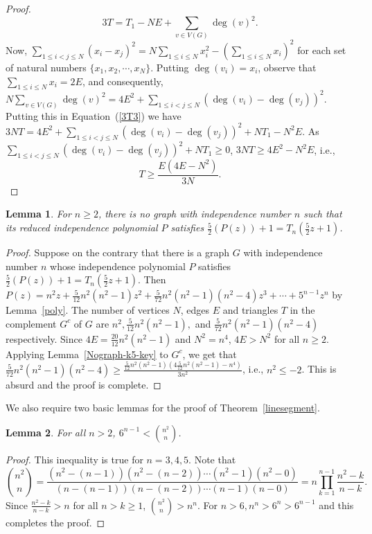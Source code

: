 \documentclass[12pt,a4paper]{article}
\theoremstyle{plain}
\newtheorem{lemma}{Lemma}
\numberwithin{equation}{section}
\begin{document}
\begin{proof}
\begin{equation}
	3T =T_1 -NE +\sum_{v \in V(G)} \deg(v)^2.
	\label{3T3}
	\end{equation} 
Now, $\sum_{1 \leq i <j\leq N} (x_i -x_j)^2 =N\sum_{1\leq i \leq N} x_i ^2 - (\sum_{1 \leq i \leq N} x_i)^2$ for each set of natural numbers $\{x_1, x_2, \cdots, x_N\}$. Putting $\deg(v_i)=x_i$, observe that $\sum_{1 \leq i \leq N} x_i = 2E$, and consequently,  $N \sum_{v \in V(G)} \deg(v)^2 =4E^2+\sum_{1 \leq i < j\leq N} (\deg(v_i) -\deg(v_j))^2$. Putting this in Equation~(\ref{3T3}) we have $3 N T  = 4E^2 + \sum_{1 \leq i <j \leq N} (\deg(v_i) -\deg(v_j))^2 +NT_1 -N^2 E$. As $ \sum_{1 \leq i <j \leq N} (\deg(v_i) -\deg(v_j))^2 +NT_1 \geq 0$, $3 NT  \geq 4E^2 -N^2 E$, i.e., $$ T   \geq \frac{E(4E -N^2)}{3N}.$$ 
  \end{proof}
  \begin{lemma}
  	For $n \geq 2$, there is no graph with independence number $n$ such that its reduced independence polynomial $P$ satisfies $\frac{5}{2}(P(z))+1=T_n (\frac{5}{2}z+1)$.
  	\label{knot5}
  \end{lemma}
  \begin{proof}
  	Suppose on the contrary that there is a graph $G$ with independence number $n$ whose independence polynomial  $P$ satisfies $\frac{5}{2}(P(z))+1=T_n (\frac{5}{2}z+1)$. Then $P(z) = n^2z + \frac{5}{12}n^2(n^2-1)z^2 +  \frac{5}{72}n^2(n^2-1)(n^2-4)z^3  + \cdots + 5^{n-1}z^n$ by Lemma~\ref{poly}.
  	 The number of vertices $N$, edges $E$ and triangles $T$ in the complement $G^c$ of $G$ are $n^2,  \frac{5}{12}n^2 (n^2 -1), $ and $ \frac{5}{72} n^2 (n^2 -1)(n^2 -4) $ respectively. Since $4E =  \frac{20}{12} n^2 (n^2-1)$ and $ N^2= n^4$, $4E > N^2$ for all $n \geq 2$. Applying Lemma~\ref{Nograph-k5-key} to $G^c$, we get that $  \frac{5}{72} n^2 (n^2-1)(n^2 -4)  \geq  \frac{\frac{5}{12} n^2 (n^2-1) (4 \frac{5}{12} n^2 (n^2-1) -n^4)}{3n^2}$, i.e., $n^2 \leq -2$. This is absurd and the proof is complete.
  	 
  \end{proof}
   We also require two basic lemmas for the proof of Theorem~\ref{linesegment}.
  \begin{lemma}
  	\label{anidentity}
  	For all $n>2$, $6^{n-1} < \binom{n^2}{n}$.
  \end{lemma}
  
  \begin{proof}
  	This inequality is true for $n=3,4,5$. Note that
  	$$\binom{n^2}{n}=\frac{(n^2 -(n-1))(n^2-(n-2)) \cdots (n^2-1)(n^2-0) }{(n  -(n-1))(n -(n-2)) \cdots (n-1)(n -0) } =n\prod_{k=1} ^{n-1} \frac{n^2-k}{n-k}.$$ 
  	Since  $\frac{n^2 -k}{n-k} >n $ for all $n> k \geq 1$, $ \binom{n^2}{n}> n^n$.  For $n>6, n^n> 6^n > 6^{n-1}$ and this completes the proof. 
  \end{proof}
  
\end{document}
